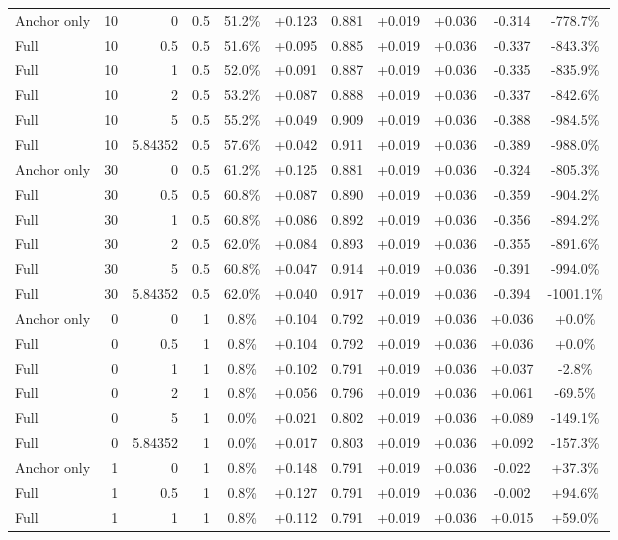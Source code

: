 \begin{table}[htbp]
\begin{tabular}{lrrrccccccc}
Anchor only & 10 & 0 & 0.5 & 51.2\% & +0.123 & 0.881 & +0.019 & +0.036 & -0.314 & -778.7\% \\
Full & 10 & 0.5 & 0.5 & 51.6\% & +0.095 & 0.885 & +0.019 & +0.036 & -0.337 & -843.3\% \\
Full & 10 & 1 & 0.5 & 52.0\% & +0.091 & 0.887 & +0.019 & +0.036 & -0.335 & -835.9\% \\
Full & 10 & 2 & 0.5 & 53.2\% & +0.087 & 0.888 & +0.019 & +0.036 & -0.337 & -842.6\% \\
Full & 10 & 5 & 0.5 & 55.2\% & +0.049 & 0.909 & +0.019 & +0.036 & -0.388 & -984.5\% \\
Full & 10 & 5.84352 & 0.5 & 57.6\% & +0.042 & 0.911 & +0.019 & +0.036 & -0.389 & -988.0\% \\
Anchor only & 30 & 0 & 0.5 & 61.2\% & +0.125 & 0.881 & +0.019 & +0.036 & -0.324 & -805.3\% \\
Full & 30 & 0.5 & 0.5 & 60.8\% & +0.087 & 0.890 & +0.019 & +0.036 & -0.359 & -904.2\% \\
Full & 30 & 1 & 0.5 & 60.8\% & +0.086 & 0.892 & +0.019 & +0.036 & -0.356 & -894.2\% \\
Full & 30 & 2 & 0.5 & 62.0\% & +0.084 & 0.893 & +0.019 & +0.036 & -0.355 & -891.6\% \\
Full & 30 & 5 & 0.5 & 60.8\% & +0.047 & 0.914 & +0.019 & +0.036 & -0.391 & -994.0\% \\
Full & 30 & 5.84352 & 0.5 & 62.0\% & +0.040 & 0.917 & +0.019 & +0.036 & -0.394 & -1001.1\% \\
Anchor only & 0 & 0 & 1 & 0.8\% & +0.104 & 0.792 & +0.019 & +0.036 & +0.036 & +0.0\% \\
Full & 0 & 0.5 & 1 & 0.8\% & +0.104 & 0.792 & +0.019 & +0.036 & +0.036 & +0.0\% \\
Full & 0 & 1 & 1 & 0.8\% & +0.102 & 0.791 & +0.019 & +0.036 & +0.037 & -2.8\% \\
Full & 0 & 2 & 1 & 0.8\% & +0.056 & 0.796 & +0.019 & +0.036 & +0.061 & -69.5\% \\
Full & 0 & 5 & 1 & 0.0\% & +0.021 & 0.802 & +0.019 & +0.036 & +0.089 & -149.1\% \\
Full & 0 & 5.84352 & 1 & 0.0\% & +0.017 & 0.803 & +0.019 & +0.036 & +0.092 & -157.3\% \\
Anchor only & 1 & 0 & 1 & 0.8\% & +0.148 & 0.791 & +0.019 & +0.036 & -0.022 & +37.3\% \\
Full & 1 & 0.5 & 1 & 0.8\% & +0.127 & 0.791 & +0.019 & +0.036 & -0.002 & +94.6\% \\
Full & 1 & 1 & 1 & 0.8\% & +0.112 & 0.791 & +0.019 & +0.036 & +0.015 & +59.0\% \\

\end{tabular}
\end{table}
